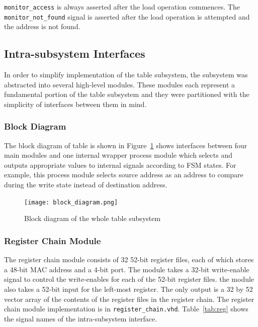 \documentclass{article}
\begin{document}
\texttt{monitor\_access} is always asserted after the load operation commences. The \texttt{monitor\_not\_found} signal is asserted after the load operation is attempted and the address is not found.

\subsection{Intra-subsystem Interfaces}

In order to simplify implementation of the table subsystem, the subsystem was abstracted into several high-level modules. These modules each represent a fundamental portion of the table subsystem and they were partitioned with the simplicity of interfaces between them in mind. 

\newpage
\subsubsection{Block Diagram}
The block diagram of table is shown in Figure~\ref{fig:block_diagram} shows interfaces between four main modules and one internal wrapper process module which selects and outputs appropriate values to internal signals according to FSM states. For example, this process module selects source address as an address to compare during the write state instead of destination address. 
\begin{figure}[ht!]
  \centering
  	\texttt{[image: block\_diagram.png]}
  \caption{Block diagram of the whole table subsystem}
  \label{fig:block_diagram}
\end{figure}


\subsubsection{Register Chain Module}

The register chain module consists of 32 52-bit register files, each of which stores a 48-bit MAC address and a 4-bit port. The module takes a 32-bit write-enable signal to control the write-enables for each of the 52-bit register files. the module also takes a 52-bit input for the left-most register. The only output is a 32 by 52 vector array of the contents of the register files in the register chain. The register chain module implementation is in \texttt{register\_chain.vhd}. Table~\ref{tab:reg} shows the signal names of the intra-subsystem interface. 
\end{document}
